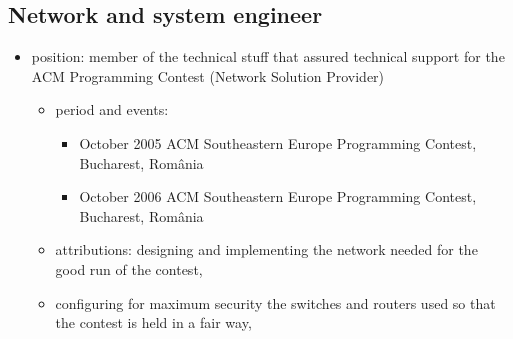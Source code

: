 	\subsection{Network and system engineer}
		\begin{itemize}
 			\item position: member of the technical stuff that assured technical support for the ACM Programming Contest (Network Solution Provider)
			\begin{itemize}
		 		
				\item period and events: 
				\begin{itemize}
					\item October 2005 ACM Southeastern Europe Programming Contest, Bucharest, România
					\item October 2006 ACM Southeastern Europe Programming Contest, Bucharest, România
				\end{itemize}
				\item attributions: designing and implementing the network needed for the good run of the contest, 
				\item configuring for maximum security the switches and routers used so that the contest is held in a fair way,


\end{itemize}
\end{itemize}
